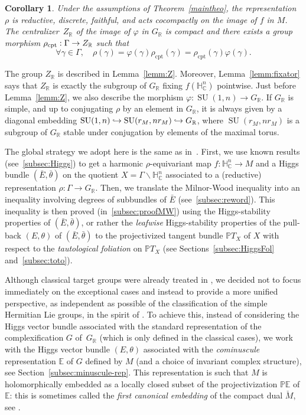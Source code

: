 \documentclass[JEP,XML,SOM,Unicode,NoFloatCountersInSection]{cedram}
\newcommand{\hto}{\mathrel{\lhook\joinrel\to}}
\newcommand{\citestar}[3]{\cite[#3]{#1}}
\theoremstyle{plain}
\newtheorem{coroA}[theoA]{Corollary}
\theoremstyle{definition}
\DeclareMathOperator{\SU}{SU}
\newcommand{\bE}{\mathbb{E}}
\newcommand{\bP}{\mathbb{P}}
\newcommand{\bR}{\mathbb{R}}
\newcommand{\HC}{{\mathbb{H}^n_\mathbb{C}}}
\newcommand{\PTX}{{\mathbb{P}T_X}}
\newcommand{\rkm}{{r_M}}
\newcommand{\rhoc}{\rho_\mathrm{cpt}}
\begin{document}
\begin{coroA}
\label{maincoro}
Under the assumptions of Theorem~\ref{maintheo}, the representation $\rho$ is reduc\-tive, discrete, faithful, and
acts cocompactly on the image of $f$ in $M$. The centralizer~$Z_\bR$ of the image of $\varphi$ in
$G_\bR$ is compact and
there exists a group morphism $\rhoc: \Gamma \to\nobreak Z_\bR$ such that
$$
\forall \gamma \in \Gamma, \quad\rho(\gamma) = \varphi(\gamma)\rhoc(\gamma) =
\rhoc(\gamma)\varphi(\gamma).
$$
\end{coroA}

The group $Z_\bR$ is described in Lemma~\ref{lemm:Z}. Moreover, Lemma~\ref{lemm:fixator} says that $Z_\bR$ is exactly the subgroup of $G_\bR$ fixing $f(\HC)$
pointwise. Just
before Lemma~\ref{lemm:Z}, we also describe the
morphism $\varphi:\SU(1,n)\to G_\bR$. If $G_\bR$ is simple, and up to conjugating $\rho$ by an
element in $G_\bR$, it is always given by a diagonal embedding
$\SU(1,n)\hto\SU(\rkm,n\rkm)\hto G_\bR$, where
$\SU(\rkm,n\rkm)$ is a subgroup of $G_\bR$ stable under conjugation by elements of the maximal torus.

The global strategy we
adopt here is the same as in~\cite{KM}.
First, we use known results (see~\ref{subsec:Higgs}) to get a harmonic $\rho$-equivariant
map $f:\HC\to M$ and a Higgs bundle $(\bar E,\bar\theta)$ on the quotient
$X=\Gamma\backslash\HC$ associated
to a (reductive) representation \hbox{$\rho:\Gamma\to G_\bR$}. Then,
we translate the
Milnor-Wood inequality into an inequality involving degrees of subbundles of $\bar E$
(see~\ref{subsec:reword}). This inequality is then proved (in~\ref{subsec:proofMW}) using the
Higgs-stability properties of
$(\bar E,\bar\theta)$,
or rather the \emph{leafwise} Higgs-stability properties of the pull-back $(E,\theta)$ of
$(\bar E,\bar\theta)$ to the
projectivized tangent bundle $\PTX$ of $X$ with respect to the \emph{tautological foliation} on $\PTX$
(see Sections~\ref{subsec:HiggsFol} and~\ref{subsec:toto}).

Although classical target groups were already treated in \cite{KM}, we decided not to focus
immediately on the exceptional cases and instead to provide a
more unified perspective, as independent as possible of the
classification of the simple Hermitian
Lie groups, in the spirit of \cite{biquard}. To achieve this, instead of considering the Higgs
vector bundle associated with the standard representation of the complexification $G$ of~$G_\bR$
(which is only defined in the classical cases), we
work with the Higgs
vector bundle $(E,\theta)$ associated with the \emph{cominuscule} representation
$\bE$ of $G$ defined by $M$ (and a choice of invariant complex structure),
see Section~\ref{subsec:minuscule-rep}. This representation is such that
$M$ is holomorphically embedded as a locally closed subset of
the projectivization $\bP\bE$ of $\bE$: this is sometimes called the \emph{first canonical
embedding} of the compact dual $\check{M}$, see \citestar{nakagawa}*{p.\,651}.
\end{document}
